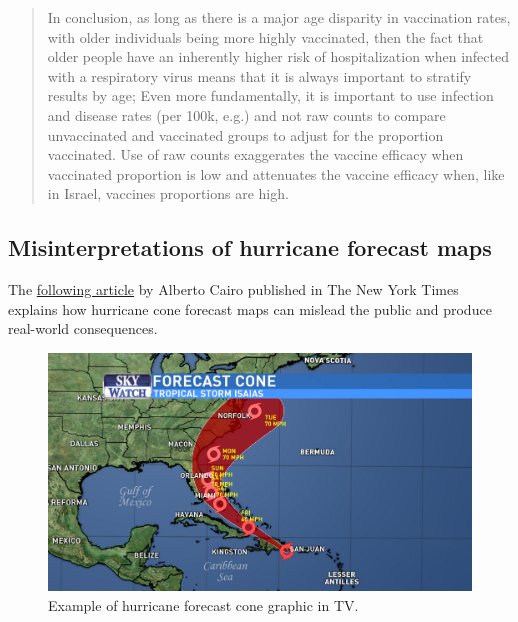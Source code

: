 \documentclass[
]{book}
\begin{document}
\begin{quote}
In conclusion, as long as there is a major age disparity in vaccination rates, with older individuals being more highly vaccinated, then the fact that older people have an inherently higher risk of hospitalization when infected with a respiratory virus means that it is always important to stratify results by age; Even more fundamentally, it is important to use infection and disease rates (per 100k, e.g.) and not raw counts to compare unvaccinated and vaccinated groups to adjust for the proportion vaccinated. Use of raw counts exaggerates the vaccine efficacy when vaccinated proportion is low and attenuates the vaccine efficacy when, like in Israel, vaccines proportions are high.
\end{quote}

\hypertarget{viz-hurricane}{%
\subsection{Misinterpretations of hurricane forecast maps}\label{viz-hurricane}}

The \href{https://www.nytimes.com/interactive/2019/08/29/opinion/hurricane-dorian-forecast-map.html}{following article} by Alberto Cairo published in The New York Times explains how hurricane cone forecast maps can mislead the public and produce real-world consequences.

\begin{figure}

{\centering \includegraphics[width=0.66\linewidth]{Figures/hurricane-forecast-maps-tv} 

}

\caption{Example of hurricane forecast cone graphic in TV.}\label{fig:hurricane-tv}
\end{figure}
\end{document}
